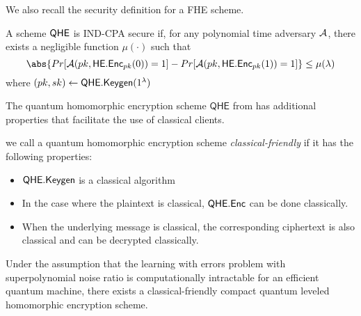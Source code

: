 We also recall the security definition for a FHE scheme.

\begin{definition}
    A scheme $\mathsf{QHE}$ is IND-CPA secure if, for any polynomial time adversary $\mathcal{A}$, there exists a negligible function $\mu(\cdot)$ such that
    $$\abs{Pr[\cA(pk, \mathsf{HE.Enc}_{pk}(0))=1]-Pr[\cA(pk, \mathsf{HE.Enc}_{pk}(1))=1]}\leq\mu(\lambda)$$
    where $(pk, sk)\leftarrow\mathsf{QHE.Keygen}(1^\lambda)$
\end{definition}

The quantum homomorphic encryption scheme $\mathsf{QHE}$ from \cite{mahadev_qfhe} has additional properties that facilitate the use of classical clients.

\begin{definition} \label{def:classical-friendly}
    we call a quantum homomorphic encryption scheme \emph{classical-friendly} if it has the following properties:
    \begin{itemize}
        \item $\mathsf{QHE.Keygen}$ is a classical algorithm
        \item In the case where the plaintext is classical, $\mathsf{QHE.Enc}$ can be done classically.
        \item When the underlying message is classical, the corresponding ciphertext is also classical and can be decrypted classically.
    \end{itemize}
\end{definition}

\begin{theorem} 
    Under the assumption that the learning with errors problem with superpolynomial noise ratio is computationally intractable for an efficient quantum machine,
    there exists a classical-friendly compact quantum leveled homomorphic encryption scheme.
\end{theorem}


